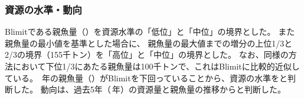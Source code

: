 \subsubsection{資源の水準・動向}
Blimitである親魚量（\makeatletter{}\makeatother）を資源水準の「低位」と「中位」の境界とした。
また親魚量の最小値を基準とした場合に、
親魚量の最大値までの増分の上位1/3と2/3の境界（\textcolor[cmyk]{0,1,0,0}{155千トン}）を「高位」と「中位」の境界とした。
なお、同様の方法において下位1/3にあたる親魚量は\textcolor[cmyk]{0,1,0,0}{100千トン}で、これはBlimitに比較的近似している。
{\ThisYr}\,年の親魚量（\makeatletter{}\makeatother）がBlimitを下回っていることから、資源の水準を{\StockLevel}と判断した。
動向は、過去5年（\makeatletter{}\makeatother{}\makeatletter{}\makeatother\,年）の資源量と親魚量の推移から{\StockTrend}と判断した。

